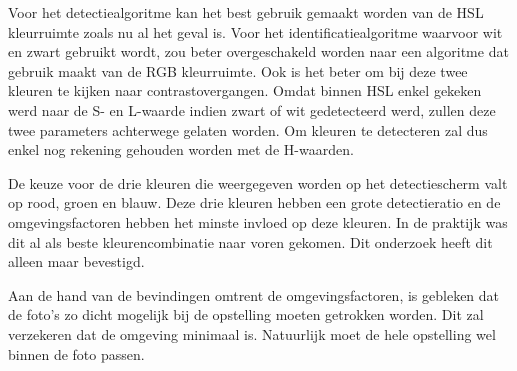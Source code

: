 Voor het detectiealgoritme kan het best gebruik gemaakt worden van de HSL kleurruimte zoals nu al het geval is. Voor het identificatiealgoritme waarvoor wit en zwart gebruikt wordt, zou beter overgeschakeld worden naar een algoritme dat gebruik maakt van de RGB kleurruimte. Ook is het beter om bij deze twee kleuren te kijken naar contrastovergangen. Omdat binnen HSL enkel gekeken werd naar de S- en L-waarde indien zwart of wit gedetecteerd werd, zullen deze twee parameters achterwege gelaten worden. Om kleuren te detecteren zal dus enkel nog rekening gehouden worden met de H-waarden.

De keuze voor de drie kleuren die weergegeven worden op het detectiescherm valt op rood, groen en blauw. Deze drie kleuren hebben een grote detectieratio en de omgevingsfactoren hebben het minste invloed op deze kleuren. In de praktijk was dit al als beste kleurencombinatie naar voren gekomen. Dit onderzoek heeft dit alleen maar bevestigd.

Aan de hand van de bevindingen omtrent de omgevingsfactoren, is gebleken dat de foto's zo dicht mogelijk bij de opstelling moeten getrokken worden. Dit zal verzekeren dat de omgeving minimaal is. Natuurlijk moet de hele opstelling wel binnen de foto passen.

